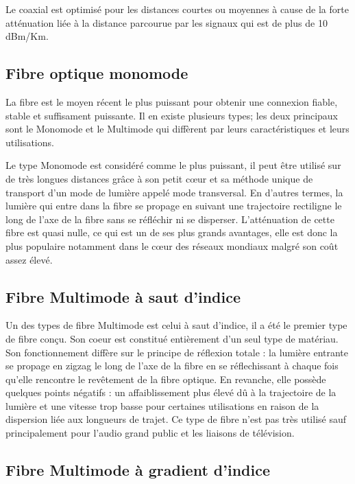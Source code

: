 \documentclass[12]{article}
\begin{document}
Le coaxial est optimisé pour les distances courtes ou moyennes à cause de la forte atténuation liée à la distance parcourue par les signaux qui est de plus de 10 dBm/Km. 

\subsection{Fibre optique monomode}

La fibre est le moyen récent le plus puissant pour obtenir une connexion fiable, stable et suffisament puissante. Il en existe plusieurs types; les deux principaux sont le Monomode et le Multimode qui diffèrent par leurs caractéristiques et leurs utilisations. 

Le type Monomode est considéré comme le plus puissant, il peut être utilisé sur de très longues distances grâce à son petit cœur et sa méthode unique de transport d'un mode de lumière appelé mode transversal. En d'autres termes, la lumière qui entre dans la fibre se propage en suivant une trajectoire rectiligne le long de l'axe de la fibre sans se réfléchir ni se disperser.
L'atténuation de cette fibre est quasi nulle, ce qui est un de ses plus grands avantages, elle est donc la plus populaire notamment dans le cœur des réseaux mondiaux malgré son coût assez élevé. 

\subsection{Fibre Multimode à saut d'indice}

Un des types de fibre Multimode est celui à saut d'indice, il a été le premier type de fibre conçu. Son coeur est constitué entièrement d'un seul type de matériau. Son fonctionnement diffère sur le principe de réflexion totale : la lumière entrante se propage en zigzag le long de l'axe de la fibre en se réflechissant à chaque fois qu'elle rencontre le revêtement de la fibre optique.
En revanche, elle possède quelques points négatifs : un affaiblissement plus élevé dû à la trajectoire de la lumière et une vitesse trop basse pour certaines utilisations en raison de la dispersion liée aux longueurs de trajet. Ce type de fibre n'est pas très utilisé sauf principalement pour l'audio grand public et les liaisons de télévision. 

\subsection{Fibre Multimode à gradient d'indice}
\end{document}
